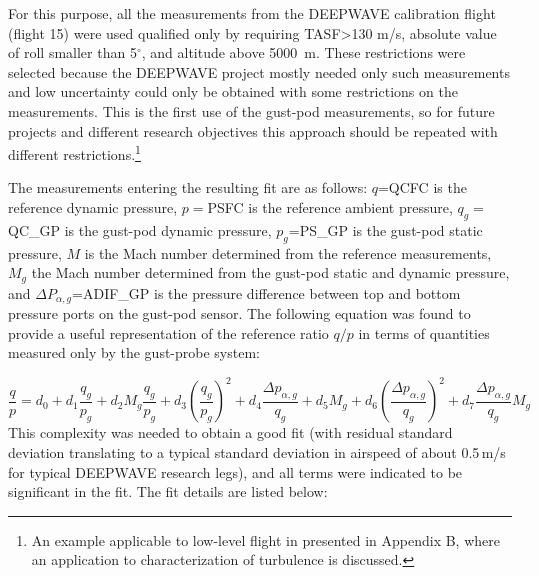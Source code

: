 \documentclass[12pt,twoside,english]{article}\usepackage[]{graphicx}\usepackage[]{color}
\let\OrgIndex\index
\renewcommand*{\index}[1]{\OrgIndex{#1}}
\begin{document}
For this purpose, all the measurements from the DEEPWAVE calibration flight (flight 15) were used qualified only by requiring TASF>130 m/s, absolute value of roll smaller than 5$^{\circ}$, and altitude above 5000~m. These restrictions were selected because the DEEPWAVE project mostly needed only such measurements and low uncertainty could only be obtained with some restrictions on the measurements. This is the first use of the gust-pod measurements, so for future projects and different research objectives this approach should be repeated with different restrictions.\footnote{An example applicable to low-level flight in presented in Appendix B, where an application to characterization of turbulence is discussed.} 



The measurements entering the resulting fit are as follows: $q$=QCFC is the reference dynamic pressure, $p=$PSFC is the reference ambient pressure, $q_{g}=$QC\_GP is the gust-pod dynamic pressure, $p_{g}$=PS\_GP is the gust-pod static pressure, $M$ is the Mach number determined from the reference measurements, $M_{g}$ the Mach number determined from the gust-pod static and dynamic pressure, and $\Delta P_{\alpha,g}$=ADIF\_GP is the pressure difference between top and bottom pressure ports on the gust-pod sensor. The following equation was found to provide a useful representation of the reference ratio $q/p$ in terms of quantities measured only by the gust-probe system: 

\begin{equation}
\frac{q}{p}=d_{0}+d_{1}\frac{q_{g}}{p_{g}}+d_{2}M_{g}\frac{q_{g}}{p_{g}}+d{}_{3}\left(\frac{q_{g}}{p_{g}}\right)^{2}+d_{4}\frac{\Delta p_{\alpha,g}}{q_{g}}+d_{5}M_{g}+d_{6}\left(\frac{\Delta p_{\alpha,g}}{q_{g}}\right)^{2}+d_{7}\frac{\Delta p_{\alpha,g}}{q_{g}}M_{g}\label{eq:TASfit}
\end{equation}
This complexity was needed to obtain a good fit (with residual standard deviation translating to a typical standard deviation in airspeed of about 0.5\,m/s for typical DEEPWAVE research legs), and all terms were indicated to be significant in the fit. The fit details are listed below: 
\end{document}
